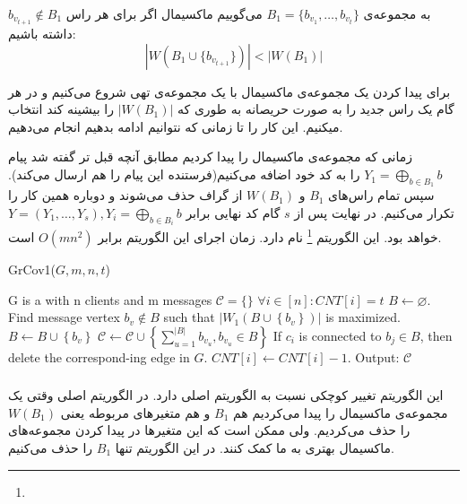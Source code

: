 به مجموعه‌ی 
$B_1 = \{b_{v_1}, \ldots, b_{v_t}\}$
می‌گوییم ماکسیمال اگر برای هر راس
$b_{v_{t  +1}} \notin B_1$
داشته باشیم:
\begin{equation}
	\tag{شرط ماکسیمال بودن}
	|W(B_1 \cup \{b_{v_{t + 1}} \})| < |W(B_1)|
\end{equation}

برای پیدا کردن یک مجموعه‌ی ماکسیمال با یک مجموعه‌ی تهی شروع می‌کنیم و در هر گام یک راس جدید را به صورت حریصانه به طوری که 
$|W(B_1)|$
را بیشینه کند انتخاب میکنیم. این کار را تا زمانی که نتوانیم ادامه بدهیم انجام می‌دهیم.

زمانی که مجموعه‌ی ماکسیمال را پیدا کردیم مطابق آنچه قبل تر گفته شد پیام
 $Y_1 = \bigoplus\limits_{b \in B_1} b$
 را به کد خود اضافه می‌کنیم(فرستنده این پیام را هم ارسال می‌کند). سپس تمام راس‌های
 $B_1$
 و
 $W(B_1)$
 از گراف حذف می‌شوند و دوباره همین کار را تکرار می‌کنیم. در نهایت پس از 
 $s$
 گام کد نهایی برابر
 $Y = (Y_1, \ldots, Y_s), Y_i =  \bigoplus\limits_{b \in B_i} b$
 خواهد بود. این الگوریتم
 \GRCOVone\footnote{}
 	نام دارد. زمان اجرای این الگوریتم برابر
 	$O(mn^2)$
 	است.
 	\begin{algorithm}[H]
 		\caption{GrCov1($G,m,n,t$) \cite{pliable2015paper}}
 		\label{algorithm:grcov1}
 		\begin{algorithmic}[1]
 			\State G is a \picodt with n clients and m messages
 			\State $\mathcal{C} = \{\}$
 			\State $\forall i \in [n]: CNT[i] = t$ 
		 			\State $B \leftarrow \varnothing$.
				 			\State Find message vertex $b_v \notin B$ such that $\left|W_1\left(B \cup\left\{b_v\right\}\right)\right|$ is maximized.
				 			\State $B \leftarrow B \cup\left\{b_v\right\}$
		 			\EndWhile
		 			\State $\mathcal{C} \leftarrow \mathcal{C} \cup\left\{\sum_{u=1}^{|B|} b_{v_u}, b_{v_u} \in B\right\}$
		 			\State If $c_i$ is connected to $b_j \in B$, then delete the correspond-ing edge in $G$.
		 			\State $CNT[i] \leftarrow CNT[i]-1$.
		 			\EndFor
 			\EndWhile
 			\State Output: $\mathcal{C}$
 		\end{algorithmic}
 	\end{algorithm}
 \subsubsection{
 }
 این الگوریتم تغییر کوچکی نسبت به الگوریتم اصلی دارد. در الگوریتم اصلی وقتی یک مجموعه‌ی ماکسیمال را پیدا می‌کردیم هم
 $B_1$
 و هم متغیرهای مربوطه یعنی
 $W(B_1)$
 را حذف می‌کردیم. ولی ممکن است که این متغیرها در پیدا کردن مجموعه‌های ماکسیمال بهتری به ما کمک کنند. در این الگوریتم تنها
 $B_1$
 را حذف می‌کنیم.
 
